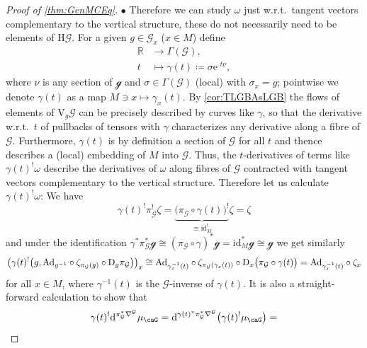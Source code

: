 \documentclass[reqno,a4paper,oneside]{amsart}
\newcommand\mutot{\mu_\caG}
\newcommand{\e}{\ensuremath{\mathrm{e\;\!}}}
\theoremstyle{plain}
\theoremstyle{remark}
\theoremstyle{definition}
\begin{document}
\begin{proof}[Proof of \ref{thm:GenMCEq}]
$\bullet$ Therefore we can study $\omega$ just w.r.t.\ tangent vectors complementary to the vertical structure, these do not necessarily need to be elements of $\mathrm{H}\mathcal{G}$. For a given $g \in \mathcal{G}_x$ ($x \in M$) define
\begin{align*}
\mathbb{R} &\to \Gamma(\mathcal{G}),\\
t &\mapsto \gamma(t) \coloneqq \sigma \e^{t\nu},
\end{align*}
where $\nu$ is any section of $\mathcal{g}$ and $\sigma \in \Gamma(\mathcal{G})$ (local) with $\sigma_x = g$; pointwise we denote $\gamma(t)$ as a map $M \ni x \mapsto \gamma_x(t)$. By \ref{cor:TLGBAsLGB} the flows of elements of $\mathrm{V}_g\mathcal{G}$ can be precisely described by curves like $\gamma$, so that the derivative w.r.t.\ $t$ of pullbacks of tensors with $\gamma$ characterizes any derivative along a fibre of $\mathcal{G}$. Furthermore, $\gamma(t)$ is by definition a section of $\mathcal{G}$ for all $t$ and thence describes a (local) embedding of $M$ into $\mathcal{G}$. Thus, the $t$-derivatives of terms like $\gamma(t)^!\omega$ describe the derivatives of $\omega$ along fibres of $\mathcal{G}$ contracted with tangent vectors complementary to the vertical structure. Therefore let us calculate $\gamma(t)^!\omega$: We have
\begin{equation*}
\gamma(t)^!\pi_{\mathcal{G}}^!\zeta
=
{\underbrace{\bigl( \pi_{\mathcal{G}} \circ \gamma(t) \bigr)^!}_{\equiv \mathrm{id}_M^!}}\zeta
=
\zeta
\end{equation*}
and under the identification $\gamma^*\pi_{\mathcal{G}}^*\mathcal{g} \cong (\pi_{\mathcal{G}} \circ \gamma)^*\mathcal{g} = \mathrm{id}_M^*\mathcal{g} \cong \mathcal{g}$ we get similarly
\begin{equation*}
\mleft( \gamma(t)^!\mleft( g, \mathrm{Ad}_{g^{-1}}\circ \zeta_{\pi_{\mathcal{G}}(g)} \circ \mathrm{D}_g\pi_{\mathcal{G}} \mright) \mright)_x
\cong
\mathrm{Ad}_{\gamma^{-1}_x(t)} \circ \zeta_{\pi_{\mathcal{G}}\mleft(\gamma_x(t)\mright)} \circ \mathrm{D}_x\bigl( \pi_{\mathcal{G}} \circ \gamma(t) \bigr)
=
\mathrm{Ad}_{\gamma^{-1}_x(t)} \circ \zeta_{x}
\end{equation*}
for all $x \in M$, where $\gamma^{-1}(t)$ is the $\mathcal{G}$-inverse of $\gamma(t)$. It is also a straight-forward calculation to show that 
\begin{equation*}
\gamma(t)^!\mathrm{d}^{\pi_{\mathcal{G}}^*\nabla^{\mathcal{G}}} \mutot
=
\mathrm{d}^{\gamma(t)^*\pi_{\mathcal{G}}^*\nabla^{\mathcal{G}}} \mleft( \gamma(t)^!\mutot\mright)
=

\end{equation*}
\end{proof}
\end{document}
